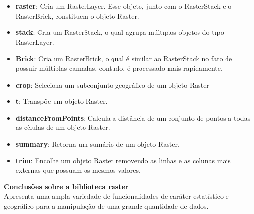\documentclass[12pt]{article}
\begin{document}
\begin{itemize}

\item \textbf{raster}: Cria um RasterLayer. Esse objeto, junto com o RasterStack e o RasterBrick, constituem o objeto Raster.
\item \textbf{stack}: Cria um RasterStack, o qual agrupa múltiplos objetos do tipo RasterLayer.
\item \textbf{Brick}: Cria um RasterBrick, o qual é similar ao RasterStack no fato de possuir múltiplas camadas, contudo, é processado mais rapidamente.
\item \textbf{crop}: Seleciona um subconjunto geográfico de um objeto Raster
\item \textbf{t}: Transpõe um objeto Raster.
\item \textbf{distanceFromPoints}: Calcula a distância de um conjunto de pontos a todas as células de um objeto Raster.
\item \textbf{summary}: Retorna um sumário de um objeto Raster.
\item \textbf{trim}: Encolhe um objeto Raster removendo as linhas e as colunas mais externas que possuam os mesmos valores.

\end{itemize}

\textbf{Conclusões sobre a biblioteca raster}\\

Apresenta uma ampla variedade de funcionalidades de caráter estatístico e geográfico para a manipulação de uma grande quantidade de dados.




\end{document}
